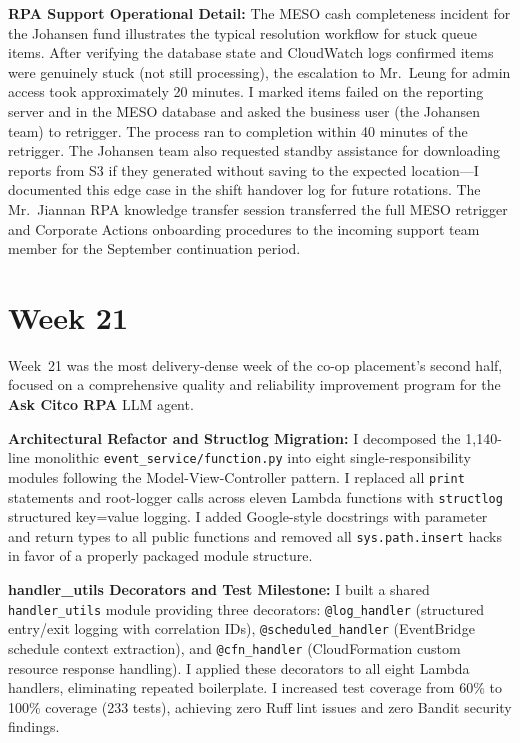 \textbf{RPA Support Operational Detail:} 
The MESO cash
completeness incident for the Johansen fund illustrates the typical
resolution workflow for stuck queue items. After verifying the database
state and CloudWatch logs confirmed items were genuinely stuck (not still
processing), the escalation to Mr.\ Leung for admin access took approximately
20 minutes. I marked items failed on the reporting server and in the MESO database and asked the business
user (the Johansen team) to retrigger. The process ran to completion
within 40 minutes of the retrigger. The Johansen team also requested standby
assistance for downloading reports from S3 if they generated without
saving to the expected location---I documented this edge case in the shift handover log for future rotations. The Mr.\ Jiannan RPA
knowledge transfer session transferred the full MESO retrigger and Corporate Actions onboarding procedures to the incoming
support team member for the September continuation period.


\FloatBarrier

\section{Week 21}
\label{sec:week21}

Week~21 was the most delivery-dense week of the co-op placement's second half,
focused on a comprehensive quality and reliability improvement program
for the \textbf{Ask Citco RPA} LLM agent.

\textbf{Architectural Refactor and Structlog Migration:} 
I decomposed the 1,140-line
monolithic \texttt{event\_service/function.py} into eight
single-responsibility modules following the Model-View-Controller pattern.
I replaced all \texttt{print} statements and root-logger calls across eleven Lambda
functions with \texttt{structlog} structured key=value logging.
I added Google-style docstrings with parameter and return types to all
public functions and removed all \texttt{sys.path.insert} hacks in
favor of a properly packaged module structure.

\textbf{handler\_utils Decorators and Test Milestone:} 
I built a shared
\texttt{handler\_utils} module providing three decorators:
\texttt{@log\_handler} (structured entry/exit logging with correlation IDs),
\texttt{@scheduled\_handler} (EventBridge schedule context extraction),
and \texttt{@cfn\_handler} (CloudFormation custom resource response handling).
I applied these decorators to all eight Lambda handlers, eliminating
repeated boilerplate. I increased test coverage from 60\% to 100\%
coverage (233 tests), achieving zero Ruff lint issues and zero Bandit security findings.

